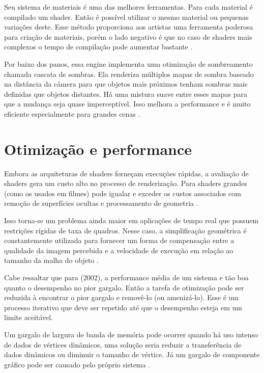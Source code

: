 Seu sistema de materiais é uma das melhores ferramentas. Para cada material é compilado um shader. Então é possível utilizar o mesmo material ou pequenas variações deste. Esse método proporciona aos artistas uma ferramenta poderosa para criação de materiais, porém o lado negativo é que no caso de shaders mais complexos o tempo de compilação pode aumentar bastante \cite{vsmid2017comparison}.

Por baixo dos panos, essa engine implementa uma otimização de sombreamento chamada cascata de sombras. Ela renderiza múltiplos mapas de sombra baseado na distância da câmera para que objetos mais próximos tenham sombras mais definidas que objetos distantes. Há uma mistura suave entre esses mapas para que a mudança seja quase imperceptível. Isso melhora a performance e é muito eficiente especialmente para grandes cenas \cite{vsmid2017comparison}. 

\section{Otimização e performance}
\label{sec:otimizacao-performance}

Embora as arquiteturas de shaders forneçam execuções rápidas, a avaliação de shaders gera um custo alto no processo de renderização. Para shaders grandes (como os usados em filmes) pode igualar e exceder os custos associados com remoção de superfícies ocultas e processamento de geometria \cite{fabio2005user}. 

Isso torna-se um problema ainda maior em aplicações de tempo real que possuem restrições rígidas de taxa de quadros. Nesse caso, a simplificação geométrica é constantemente utilizada para fornecer um forma de compensação entre a qualidade da imagem percebida e a velocidade de execução em relação ao tamanho da malha do objeto \cite{fabio2005user}.

Cabe ressaltar que para  (2002), a performance média de um sistema e tão boa quanto o desempenho no pior gargalo. Então a tarefa de otimização pode ser reduzida à encontrar o pior gargalo e removê-lo (ou amenizá-lo). Esse é um processo iterativo que deve ser repetido até que o desempenho esteja em um limite aceitável.

Um gargalo de largura de banda de memória pode ocorrer quando há uso intenso de dados de vértices dinâmicos, uma solução seria reduzir a transferência de dados dinâmicos ou diminuir o tamanho de vértice. Já um gargalo de componente gráfico pode ser causado pelo próprio sistema \cite{riguer2002performance}.

